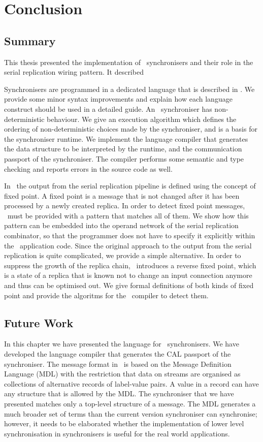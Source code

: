 \chapter{Conclusion}
    \section{Summary}
This thesis presented the implementation of \ak\ synchronisers and their role in the serial replication wiring pattern. It described 

Synchronisers are programmed in a dedicated language that is described in \cite{astrakahn}. We provide some minor syntax improvements and explain how each language construct should be used in a detailed guide. An \ak\ synchroniser has non-deterministic behaviour. We give an execution algorithm which defines the ordering of non-deterministic choices made by the synchroniser, and is a basis for the synchroniser runtime. We implement the language compiler that generates the data structure to be interpreted by the runtime, and the communication passport of the synchroniser. The compiler performs some semantic and type checking and reports errors in the source code as well.

In \ak\ the output from the serial replication pipeline is defined using the concept of fixed point. A fixed point is a message that is not changed after it has been processed by a newly created replica. In order to detect fixed point messages, \ak\ must be provided with a pattern that matches all of them. We show how this pattern can be embedded into the operand network of the serial replication combinator, so that the programmer does not have to specify it explicitly within the \ak\ application code. Since the original approach to the output from the serial replication is quite complicated, we provide a simple alternative. In order to suppress the growth of the replica chain, \ak\ introduces a reverse fixed point, which is a state of a replica that is known not to change an input connection anymore and thus can be optimised out. We give formal definitions of both kinds of fixed point and provide the algoritms for the \ak\ compiler to detect them.



    \section{Future Work}
In this chapter we have presented the language for \ak\ synchronisers. We have developed the language compiler that generates the CAL passport of the synchroniser. The message format in \ak\ is based on the Message Definition Language (MDL) with the restriction that data on streams are organised as collections of alternative records of label-value pairs. A value in a record can have any structure that is allowed by the MDL. The synchroniser that we have presented matches only a top-level structure of a message. The MDL generates a much broader set of terms than the current version synchroniser can synchronise; however, it needs to be elaborated whether the implementation of lower level synchronisation in synchronisers is useful for the real world applications.

